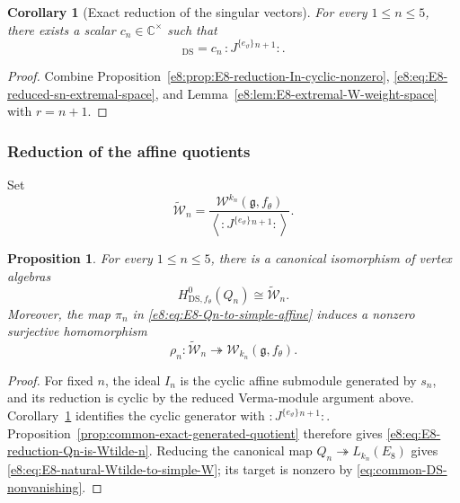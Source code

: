 \documentclass[11pt,reqno]{amsart}
\newtheorem{proposition}[theorem]{Proposition}
\newtheorem{corollary}[theorem]{Corollary}
\theoremstyle{definition}
\theoremstyle{remark}
\providecommand{\C}{\mathbb{C}}
\providecommand{\g}{\mathfrak{g}}
\providecommand{\W}{\mathcal{W}}
\providecommand{\DS}{\mathrm{DS}}
\begin{document}
\begin{corollary}[Exact reduction of the singular vectors]
\label{e8:cor:E8-exact-reduction-sn}
For every $1\le n\le5$, there exists a scalar $c_n\in\C^{\times}$ such that
\begin{equation*}
  [s_n]_{\DS}
  =c_n\,:J^{\{e_{\vartheta}\}}{}^{n+1}:.
\end{equation*}
\end{corollary}

\begin{proof}
Combine Proposition~\ref{e8:prop:E8-reduction-In-cyclic-nonzero},
\eqref{e8:eq:E8-reduced-sn-extremal-space}, and
Lemma~\ref{e8:lem:E8-extremal-W-weight-space} with $r=n+1$.
\end{proof}

\subsubsection{Reduction of the affine quotients}


Set
\begin{equation}
  \widetilde{\W}_n
  =\frac{\W^{k_n}(\g,f_{\theta})}
  {\left\langle:J^{\{e_{\vartheta}\}}{}^{n+1}:\right\rangle}.
  \label{e8:eq:E8-definition-Wtilde-n}
\end{equation}

\begin{proposition}
\label{e8:prop:E8-reduction-of-Qn}
For every $1\le n\le5$, there is a canonical isomorphism of vertex algebras
\begin{equation}
  H^0_{\DS,f_{\theta}}(Q_n)
  \cong\widetilde{\W}_n.
  \label{e8:eq:E8-reduction-Qn-is-Wtilde-n}
\end{equation}
Moreover, the map $\pi_n$ in \eqref{e8:eq:E8-Qn-to-simple-affine} induces a
nonzero surjective homomorphism
\begin{equation}
  \rho_n:\widetilde{\W}_n
  \twoheadrightarrow\W_{k_n}(\g,f_{\theta}).
  \label{e8:eq:E8-natural-Wtilde-to-simple-W}
\end{equation}
\end{proposition}

\begin{proof}
For fixed $n$, the ideal $I_n$ is the cyclic affine submodule generated by
$s_n$, and its reduction is cyclic by the reduced Verma-module argument above.
Corollary~\ref{e8:cor:E8-exact-reduction-sn} identifies the cyclic generator
with $:J^{\{e_\vartheta\}}{}^{n+1}:$.  Proposition~\ref{prop:common-exact-generated-quotient}
therefore gives \eqref{e8:eq:E8-reduction-Qn-is-Wtilde-n}.  Reducing the
canonical map $Q_n\twoheadrightarrow L_{k_n}(E_8)$ gives
\eqref{e8:eq:E8-natural-Wtilde-to-simple-W}; its target is nonzero by
\eqref{eq:common-DS-nonvanishing}.
\end{proof}
\end{document}
